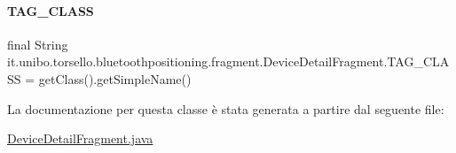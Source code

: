 \hypertarget{classit_1_1unibo_1_1torsello_1_1bluetoothpositioning_1_1fragment_1_1DeviceDetailFragment_a2e4f8435039904e724f83804823e16ac_a2e4f8435039904e724f83804823e16ac}{}\label{classit_1_1unibo_1_1torsello_1_1bluetoothpositioning_1_1fragment_1_1DeviceDetailFragment_a2e4f8435039904e724f83804823e16ac_a2e4f8435039904e724f83804823e16ac} 
\paragraph{\texorpdfstring{T\+A\+G\+\_\+\+C\+L\+A\+SS}{TAG\_CLASS}}
{\footnotesize\ttfamily final String it.\+unibo.\+torsello.\+bluetoothpositioning.\+fragment.\+Device\+Detail\+Fragment.\+T\+A\+G\+\_\+\+C\+L\+A\+SS = get\+Class().get\+Simple\+Name()\hspace{0.3cm}{\ttfamily [private]}}



La documentazione per questa classe è stata generata a partire dal seguente file\+:\begin{DoxyCompactItemize}
\item 
\hyperlink{DeviceDetailFragment_8java}{Device\+Detail\+Fragment.\+java}\end{DoxyCompactItemize}
